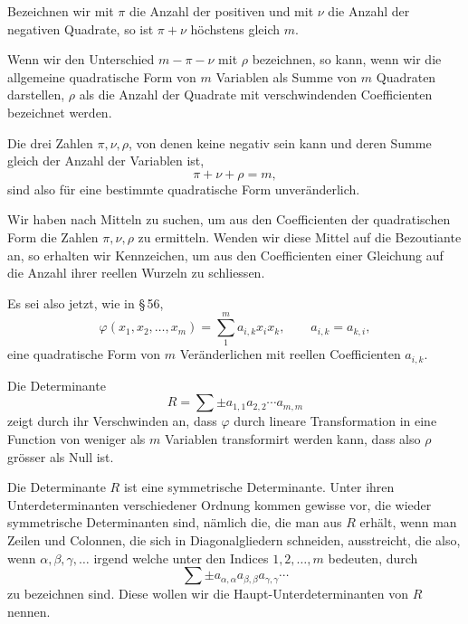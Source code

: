 \documentclass[11pt]{article}
\begin{document}
Bezeichnen wir mit $\pi$ die Anzahl der positiven und mit $\nu$ die Anzahl der negativen Quadrate, so ist $\pi+\nu$ h\"ochstens gleich $m$.

Wenn wir den Unterschied $m-\pi-\nu$ mit $\rho$ bezeichnen, so kann, wenn wir die allgemeine quadratische Form von $m$ Variablen als Summe von $m$ Quadraten darstellen, $\rho$ als die Anzahl der Quadrate mit verschwindenden Coefficienten bezeichnet werden.

Die drei Zahlen $\pi,\nu,\rho$, von denen keine negativ sein kann und deren Summe gleich der Anzahl der Variablen ist,
\begin{equation}
        \pi+\nu+\rho=m,
\tag{1}
\end{equation}
sind also f\"ur eine bestimmte quadratische Form unver\"anderlich.

Wir haben nach Mitteln zu suchen, um aus den Coefficienten der quadratischen Form die Zahlen $\pi,\nu,\rho$ zu ermitteln. Wenden wir diese Mittel auf die Bezoutiante an, so erhalten wir Kennzeichen, um aus den Coefficienten einer Gleichung auf die Anzahl ihrer reellen Wurzeln zu schliessen.

Es sei also jetzt, wie in \S\,56,
\begin{equation}
        \varphi(x_1,x_2,\ldots,x_m)=\sum_{1}^{m}a_{i,k}x_ix_k,
        \qquad a_{i,k}=a_{k,i},
\tag{2}
\end{equation}
eine quadratische Form von $m$ Ver\"anderlichen mit reellen Coefficienten $a_{i,k}$.

Die Determinante
\begin{equation}
        R=\sum \pm a_{1,1}a_{2,2}\cdots a_{m,m}
\tag{3}
\end{equation}
zeigt durch ihr Verschwinden an, dass $\varphi$ durch lineare Transformation in eine Function von weniger als $m$ Variablen transformirt werden kann, dass also $\rho$ gr\"osser als Null ist.

Die Determinante $R$ ist eine symmetrische Determinante. Unter ihren Unterdeterminanten verschiedener Ordnung kommen gewisse vor, die wieder symmetrische Determinanten sind, n\"amlich die, die man aus $R$ erh\"alt, wenn man Zeilen und Colonnen, die sich in Diagonalgliedern schneiden, ausstreicht, die also, wenn $\alpha,\beta,\gamma,\ldots$ irgend welche unter den Indices $1,2,\ldots,m$ bedeuten, durch
\begin{equation}
        \sum\pm a_{\alpha,\alpha}a_{\beta,\beta}a_{\gamma,\gamma}\cdots
\tag{4}
\end{equation}
zu bezeichnen sind. Diese wollen wir die Haupt-Unterdeterminanten von $R$ nennen.
\end{document}
